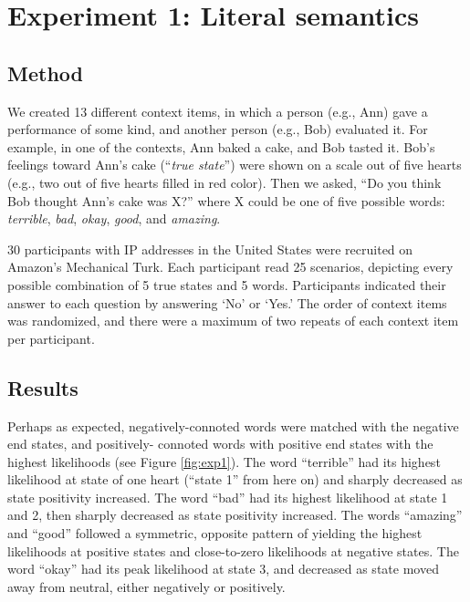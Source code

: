 \documentclass[10pt,letterpaper]{article}
\begin{document}


\section{Experiment 1: Literal semantics}

\subsection{Method}

We created 13 different context items, in which a person (e.g., Ann) gave a performance of some kind, and another person (e.g., Bob) evaluated it. For example, in one of the contexts, Ann baked a cake, and Bob tasted it. Bob's feelings toward Ann's cake (``\emph{true state}'') were shown on a scale out of five hearts (e.g., two out of five hearts filled in red color). Then we asked, ``Do you think Bob thought Ann's cake was X?'' where X could be one of five possible words: \emph{terrible}, \emph{bad}, \emph{okay}, \emph{good}, and \emph{amazing}.

30 participants with IP addresses in the United States were recruited on Amazon's Mechanical Turk. Each participant read 25 scenarios, depicting every possible combination of 5 true states and 5 words. Participants indicated their answer to each question by answering `No' or `Yes.' The order of context items was randomized, and there were a maximum of two repeats of each context item per participant.

\subsection{Results}

Perhaps as expected, negatively-connoted words were matched with the negative end states, and positively- connoted words with positive end states with the highest likelihoods (see Figure \ref{fig:exp1}). The word ``terrible'' had its highest likelihood at state of one heart (``state 1'' from here on) and sharply decreased as state positivity increased. The word ``bad'' had its highest likelihood at state 1 and 2, then sharply decreased as state positivity increased. The words ``amazing'' and ``good'' followed a symmetric, opposite pattern of yielding the highest likelihoods at positive states and close-to-zero likelihoods at negative states. The word ``okay'' had its peak likelihood at state 3, and decreased as state moved away from neutral, either negatively or positively.
\end{document}
